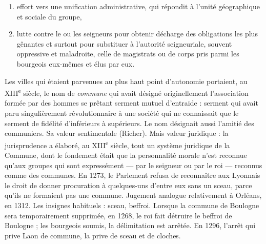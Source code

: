 \documentclass[french,twoside]{book} %
\begin{document}
\begin{enumerate}[itemsep=0pt,]
\item effort vers une unification administrative, qui répondit à l’unité géographique et sociale du groupe,
\item lutte contre le ou les seigneurs pour obtenir décharge des obligations les plus gênantes et surtout pour substituer à l’autorité seigneuriale, souvent oppressive et maladroite, celle de magistrats ou de corps pris parmi les bourgeois eux-mêmes et élus par eux.

\end{enumerate}\noindent Les villes qui étaient parvenues au plus haut point d’autonomie portaient, au XIII\textsuperscript{e} siècle, le nom de {\itshape commune} qui avait désigné originellement l’association formée par des hommes se prêtant serment mutuel d’entraide : serment qui avait paru singulièrement révolutionnaire à une société qui ne connaissait que le serment de fidélité d’inférieurs à supérieurs. Le nom désignait aussi l’amitié des communiers. Sa valeur sentimentale (Richer). Mais valeur juridique : la jurisprudence a élaboré, au XIII\textsuperscript{e} siècle, tout un système juridique de la Commune, dont le fondement était que la personnalité morale n’est reconnue qu’aux groupes qui sont expressément — par le seigneur ou par le roi — reconnus comme des communes. En 1273, le Parlement refusa de reconnaître aux Lyonnais le droit de donner procuration à quelques-uns d’entre eux sans un sceau, parce qu’ils ne formaient pas une commune. Jugement analogue relativement à Orléans, en 1312. Les insignes habituels : sceau, beffroi. Lorsque la commune de Boulogne sera temporairement supprimée, en 1268, le roi fait détruire le beffroi de Boulogne ; les bourgeois soumis, la délimitation est arrêtée. En 1296, l’arrêt qui prive Laon de commune, la prive de sceau et de cloches.\par
\end{document}
